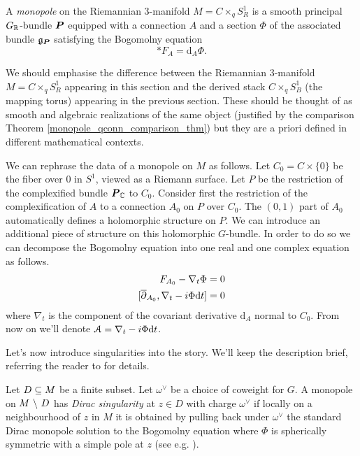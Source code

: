 \documentclass[10pt, oneside]{article}
\renewcommand{\d}{\mathrm{d}}
\begin{document}
\begin{definition}
A \emph{monopole} on the Riemannian 3-manifold $M = C \times_q S^1_R$ is a smooth principal $G_{\mathbb{R}}$-bundle $\boldsymbol{P}$ equipped with a connection $A$ and a section $\Phi$ of the associated bundle $\mathfrak{g}_{\boldsymbol{P}}$ satisfying the Bogomolny equation 
\[\ast F_A = \d_A \Phi.\]
\end{definition}

\begin{remark}
We should emphasise the difference between the Riemannian 3-manifold $M = C \times_q S^1_R$ appearing in this section and the derived stack $C \times_q S^1_B$ (the mapping torus) appearing in the previous section.  These should be thought of as smooth and algebraic realizations of the same object (justified by the comparison Theorem \ref{monopole_qconn_comparison_thm}) but they are a priori defined in different mathematical contexts.
\end{remark}

We can rephrase the data of a monopole on $M$ as follows.  Let $C_0 = C \times \{0\}$ be the fiber over $0$ in $S^1$, viewed as a Riemann surface.  Let $P$ be the restriction of the complexified bundle $\boldsymbol{P}_{\mathbb{C}}$ to $C_0$.  Consider first the restriction of the complexification of $A$ to a connection $A_0$ on $P$ over $C_0$.  The $(0,1)$ part of $A_0$ automatically defines a holomorphic structure on $P$.  We can introduce an additional piece of structure on this holomorphic $G$-bundle.  In order to do so we can decompose the Bogomolny equation into one real and one complex equation as follows.
\begin{align*}
F_{A_0} - \nabla_t \Phi &= 0 \\
[\ol{\del}_{A_0}, \nabla_t - i\Phi \d t] &= 0 
\end{align*}
where $\nabla_t$ is the component of the covariant derivative $\d_A$ normal to $C_0$.  From now on we'll denote $\mc A = \nabla_t - i\Phi \d t$.

Let's now introduce singularities into the story.  We'll keep the description brief, referring the reader to \cite{CharbonneauHurtubise, Smith} for details.
\begin{definition}
Let $D \subseteq M$ be a finite subset.  Let $\omega^\vee$ be a choice of coweight for $G$.  A monopole on $M \ \backslash \  D$ has \emph{Dirac singularity} at $z \in D$ with charge $\omega^\vee$ if locally on a neighbourhood of $z$ in $M$ it is obtained by pulling back under $\omega^\vee$ the standard Dirac monopole solution to the Bogomolny equation where $\Phi$ is spherically symmetric with a simple pole at $z$ (see e.g. \cite[Section 2.2]{CharbonneauHurtubise}).
\end{definition}
\end{document}
